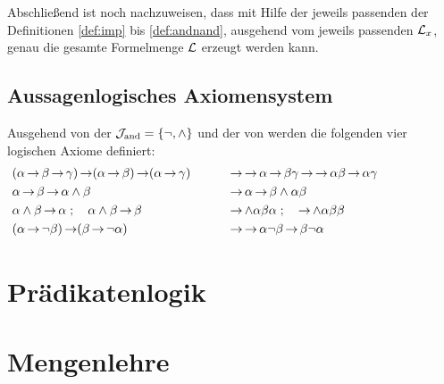 Abschließend ist noch nachzuweisen, dass mit Hilfe der jeweils passenden der Definitionen \eqref{def:imp} bis \eqref{def:andnand}, ausgehend vom jeweils passenden $\mathcal{L}_x$, genau die gesamte Formelmenge $\mathcal{L}$ erzeugt werden kann.

\subsection{Aussagenlogisches Axiomensystem}%
\label{sub:ausAxiome}

Ausgehend von der  $\mathcal{J}_{\mathrm{and}} = \{\lnot, \land\}$ und der  von \symqt{\limp} werden die folgenden vier logischen Axiome definiert:
\begin{align}
	&
	(\alpha\operatorname{\rightarrow}\beta\operatorname{\rightarrow}\gamma)\operatorname{\rightarrow}(\alpha\operatorname{\rightarrow}\beta)\operatorname{\rightarrow}(\alpha\operatorname{\rightarrow}\gamma)
	&&&& &
	& \operatorname{\rightarrow}\operatorname{\rightarrow}\alpha\operatorname{\rightarrow}\beta\gamma\operatorname{\rightarrow}\operatorname{\rightarrow}\alpha\beta\operatorname{\rightarrow}\alpha\gamma \\
	& \alpha \operatorname{\rightarrow} \beta \operatorname{\rightarrow} \alpha \land \beta
	&&&& &
	& \operatorname{\rightarrow} \alpha \operatorname{\rightarrow} \beta \land \alpha \beta \\
	& \alpha \land \beta \operatorname{\rightarrow} \alpha \;; \quad \alpha \land \beta \operatorname{\rightarrow} \beta
	&&&& &
	& \operatorname{\rightarrow} \land \alpha \beta \alpha \;; \quad \operatorname{\rightarrow} \land \alpha \beta \beta\\
	&(\alpha \operatorname{\rightarrow} \lnot \beta) \operatorname{\rightarrow} (\beta \operatorname{\rightarrow} \lnot \alpha)
	&&&& &
	& \operatorname{\rightarrow} \operatorname{\rightarrow} \alpha \lnot \beta \operatorname{\rightarrow} \beta \lnot \alpha
	&&&&&&&&&&
\end{align}
%

\section{Prädikatenlogik}%
\label{sec:Praedikatenlogik}


\section{Mengenlehre}%
\label{sec:Mengenlehre}


\Endchapter
